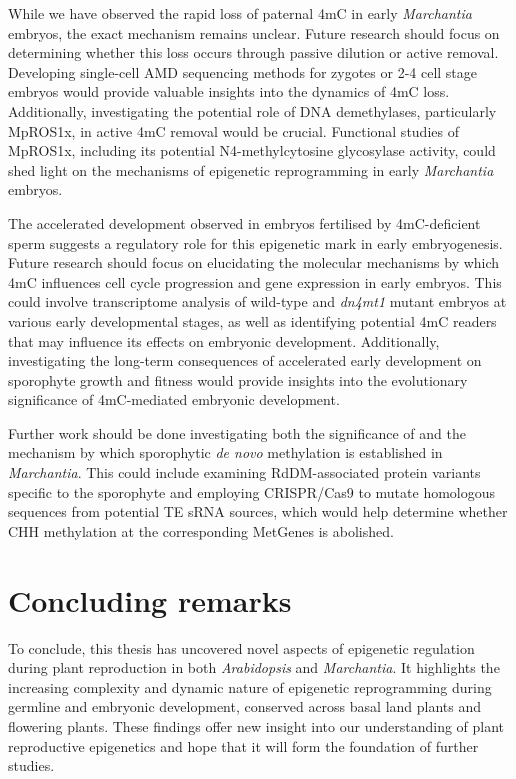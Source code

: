While we have observed the rapid loss of paternal 4mC in early \textit{Marchantia} embryos, the exact mechanism remains unclear. Future research should focus on determining whether this loss occurs through passive dilution or active removal. Developing single-cell AMD sequencing methods for zygotes or 2-4 cell stage embryos would provide valuable insights into the dynamics of 4mC loss. Additionally, investigating the potential role of DNA demethylases, particularly MpROS1x, in active 4mC removal would be crucial. Functional studies of MpROS1x, including its potential N4-methylcytosine glycosylase activity, could shed light on the mechanisms of epigenetic reprogramming in early \textit{Marchantia} embryos.

The accelerated development observed in embryos fertilised by 4mC-deficient sperm suggests a regulatory role for this epigenetic mark in early embryogenesis. Future research should focus on elucidating the molecular mechanisms by which 4mC influences cell cycle progression and gene expression in early embryos. This could involve transcriptome analysis of wild-type and \textit{dn4mt1} mutant embryos at various early developmental stages, as well as identifying potential 4mC readers that may influence its effects on embryonic development. Additionally, investigating the long-term consequences of accelerated early development on sporophyte growth and fitness would provide insights into the evolutionary significance of 4mC-mediated embryonic development. 

Further work should be done investigating both the significance of and the mechanism by which sporophytic \textit{de novo} methylation is established in \textit{Marchantia}. This could include examining RdDM-associated protein variants specific to the sporophyte and employing CRISPR/Cas9 to mutate homologous sequences from potential TE sRNA sources, which would help determine whether CHH methylation at the corresponding MetGenes is abolished.

\section{Concluding remarks}

To conclude,  this thesis has uncovered novel aspects of epigenetic regulation during plant reproduction in both \textit{Arabidopsis} and \textit{Marchantia}. It highlights the increasing complexity and dynamic nature of epigenetic reprogramming during germline and embryonic development, conserved across basal land plants and flowering plants. These findings offer new insight into our understanding of plant reproductive epigenetics and hope that it will form the foundation of further studies.